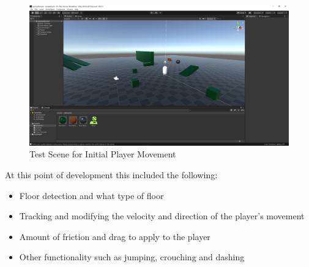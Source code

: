 \begin{figure}[H]
\centering
\includegraphics[scale=0.33]{Figures/testold.png}
\caption{Test Scene for Initial Player Movement}
\label{flrtst}
\end{figure}

\noindent At this point of development this included the following:
\begin{itemize}
\item Floor detection and what type of floor
\item Tracking and modifying the velocity and direction of the player's movement
\item Amount of friction and drag to apply to the player
\item Other functionality such as jumping, crouching and dashing
\end{itemize}

